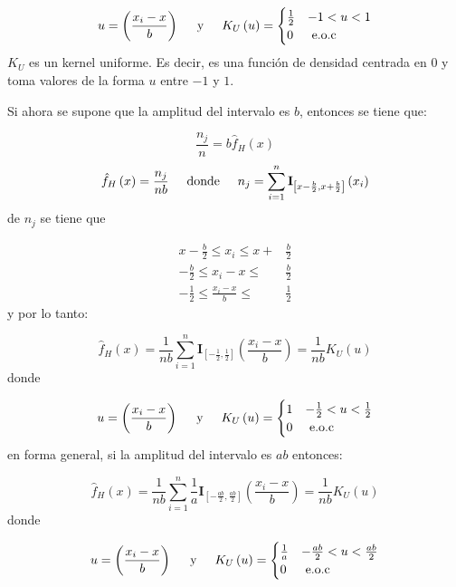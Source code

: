 \documentclass[
  letterpaper,
  DIV=11,
  numbers=noendperiod]{scrreprt}
\begin{document}
\[u = \left(\frac{x_i-x}{b}\right) \hspace{0.5cm} \mathrm{y} \hspace{0.5cm} K_U\left(u\right) = \begin{cases}\frac{1}{2} & -1<u<1 \\ 0 & \text { e.o.c }\end{cases}\]
\(K_U\) es un kernel uniforme. Es decir, es una función de densidad
centrada en \(0\) y toma valores de la forma \(u\) entre \(-1\) y \(1\).

Si ahora se supone que la amplitud del intervalo es \(b\), entonces se
tiene que:

\[\frac{n_j}{n} = b\hat{f}_H \left(x\right)\]
\[\hat{f}_H \left(x\right)=\frac{n_j}{nb} \hspace{0.5cm} \textrm{donde} \hspace{0.5cm} n_j=\sum_{i=1}^n \mathbf{I}_{\left[x-\frac{b}{2}, x+\frac{b}{2}\right]} \left(x_i\right)\]
de \(n_j\) se tiene que

\[ 
\begin{align}
x-\frac{b}{2} \leq x_i \leq x+&\frac{b}{2}\\
-\frac{b}{2} \leq x_i-x \leq &\frac{b}{2}\\
-\frac{1}{2} \leq \frac{x_i-x}{b} \leq &\frac{1}{2}
\end{align}
\] y por lo tanto:

\[\hat{f}_H \left(x\right)=\frac{1}{nb} \sum_{i=1}^n \mathbf{I}_{\left[-\frac{1}{2},\frac{1}{2}\right]}\left(\frac{x_i-x}{b}\right)=\frac{1}{nb}K_U\left(u\right)\]
donde

\[u = \left(\frac{x_i-x}{b}\right) \hspace{0.5cm} \mathrm{y} \hspace{0.5cm} K_U\left(u\right) = \begin{cases} 1 & -\frac{1}{2}<u<\frac{1}{2} \\ 0 & \text { e.o.c }\end{cases}\]
en forma general, si la amplitud del intervalo es \(ab\) entonces:

\[\hat{f}_H \left(x\right)=\frac{1}{nb} \sum_{i=1}^n \frac{1}{a} \mathbf{I}_{\left[-\frac{ab}{2},\frac{ab}{2}\right]}\left(\frac{x_i-x}{b}\right)=\frac{1}{nb}K_U\left(u\right)\]
donde

\[u = \left(\frac{x_i-x}{b}\right) \hspace{0.5cm} \mathrm{y} \hspace{0.5cm} K_U\left(u\right) = \begin{cases} \frac{1}{a} & -\frac{ab}{2}<u<\frac{ab}{2} \\ 0 & \text { e.o.c }\end{cases}\]
\end{document}

